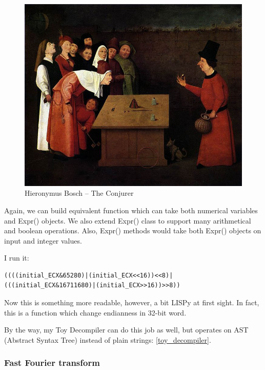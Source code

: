 \begin{figure}[H]
\centering
\includegraphics[scale=2.5]{symbolic/2_assembly/718px-Conjurer_Bosch.jpg}
\caption{Hieronymus Bosch -- The Conjurer}
\end{figure}

Again, we can build equivalent function which can take both numerical variables and Expr() objects.
We also extend Expr() class to support many arithmetical and boolean operations.
Also, Expr() methods would take both Expr() objects on input and integer values.



I run it:

\begin{lstlisting}
((((initial_ECX&65280)|(initial_ECX<<16))<<8)|(((initial_ECX&16711680)|(initial_ECX>>16))>>8))
\end{lstlisting}

Now this is something more readable, however, a bit LISPy at first sight.
In fact, this is a function which change endianness in 32-bit word.

By the way, my Toy Decompiler can do this job as well, but operates on AST (Abstract Syntax Tree) instead
of plain strings: \ref{toy_decompiler}.

\subsubsection{Fast Fourier transform}

